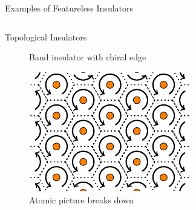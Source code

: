 \begin{frame}{Examples of Featureless Insulators}
\begin{columns}[T]
\begin{column}[T]{.5\textwidth}
\begin{block}{Topological Insulators}
\begin{figure}
			\caption{Band insulator with chiral edge \footnotemark}
		\end{figure}
		\begin{figure}
			\vskip-0.7cm
				\includegraphics[width=0.5\linewidth]{diagrams/honeycomb_breakdown.pdf}
				\caption{Atomic picture breaks down}
		\end{figure}
	\end{block}

\end{column}
\end{columns}


\end{frame}

